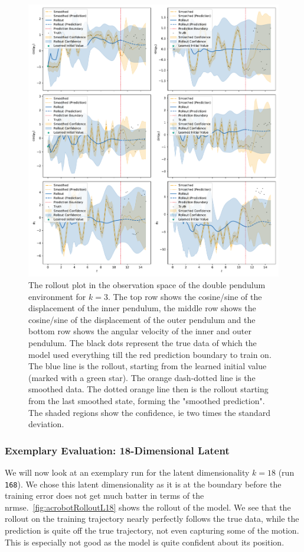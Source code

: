 			\begin{figure}
				\centering
				\includegraphics[width=\linewidth]{figures/results/acrobot-gym/run-latent-dim-03/rollout-observations-N0.pdf}
				\caption{The rollout plot in the observation space of the double pendulum environment for \(k = 3\). The top row shows the cosine/sine of the displacement of the inner pendulum, the middle row shows the cosine/sine of the displacement of the outer pendulum and the bottom row shows the angular velocity of the inner and outer pendulum. The black dots represent the true data of which the model used everything till the red prediction boundary to train on. The blue line is the rollout, starting from the learned initial value (marked with a green star). The orange dash-dotted line is the smoothed data. The dotted orange line then is the rollout starting from the last smoothed state, forming the "smoothed prediction". The shaded regions show the confidence, \ac{ie} two times the standard deviation.}
				\label{fig:acrobotRolloutL03}
			\end{figure}

		\subsubsection{Exemplary Evaluation: 18-Dimensional Latent}
			We will now look at an exemplary run for the latent dimensionality \( k = 18 \) (run \texttt{168}). We chose this latent dimensionality as it is at the boundary before the training error does not get much batter in terms of the \ac{nrmse}.~\autoref{fig:acrobotRolloutL18} shows the rollout of the model. We see that the rollout on the training trajectory nearly perfectly follows the true data, while the prediction is quite off the true trajectory, not even capturing some of the motion. This is especially not good as the model is quite confident about its position.

